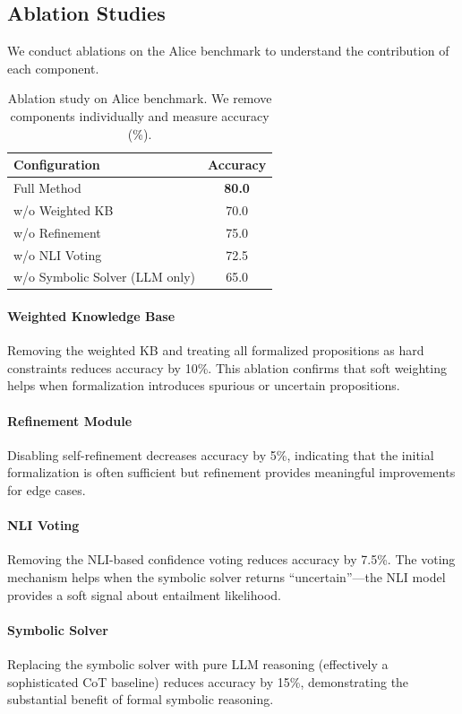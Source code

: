 \subsection{Ablation Studies}
\label{subsec:ablations}

We conduct ablations on the Alice benchmark to understand the contribution of each component.

\begin{table}[t]
\centering
\caption{Ablation study on Alice benchmark. We remove components individually and measure accuracy (\%).}
\label{tab:ablations}
\begin{tabular}{lc}
\toprule
\textbf{Configuration} & \textbf{Accuracy} \\
\midrule
Full Method & \textbf{80.0} \\
\midrule
w/o Weighted KB & 70.0 \\
w/o Refinement & 75.0 \\
w/o NLI Voting & 72.5 \\
w/o Symbolic Solver (LLM only) & 65.0 \\
\bottomrule
\end{tabular}
\end{table}

\paragraph{Weighted Knowledge Base} Removing the weighted KB and treating all formalized propositions as hard constraints reduces accuracy by 10\%. This ablation confirms that soft weighting helps when formalization introduces spurious or uncertain propositions.

\paragraph{Refinement Module} Disabling self-refinement decreases accuracy by 5\%, indicating that the initial formalization is often sufficient but refinement provides meaningful improvements for edge cases.

\paragraph{NLI Voting} Removing the NLI-based confidence voting reduces accuracy by 7.5\%. The voting mechanism helps when the symbolic solver returns ``uncertain''---the NLI model provides a soft signal about entailment likelihood.

\paragraph{Symbolic Solver} Replacing the symbolic solver with pure LLM reasoning (effectively a sophisticated CoT baseline) reduces accuracy by 15\%, demonstrating the substantial benefit of formal symbolic reasoning.

